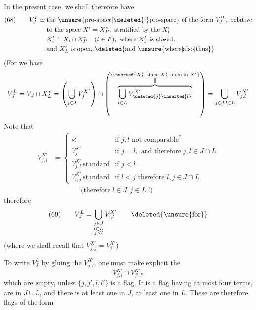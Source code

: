 
In the present case, we shall therefore have
\[
\begin{aligned}
(68)\qquad V_J^L\simeq{}&\text{the \unsure{pro-space|\deleted{t}pro-space} of the form }V_J^{\prime L},\text{ relative}\\
&\text{to the space }X'=X_{I'}^*,\text{ stratified by the }X_i'\\
&X_i'\doteq X_i\cap X_{I'}^*\quad(i\in I'),\text{ where }X_J'\text{ is closed,}\\
&\text{and }X_L'\text{ is open, }\deleted{\text{and }\unsure{\text{where}|\text{also}|\text{thus}}}
\end{aligned}
\]
(For we have
\[
V_J^L=V_J\cap X_L^*
=\left(\bigcup_{j\in J}V_j^{X'}\right)\cap
\left(\overbrace{\bigcup_{l\in L}V_{\deleted{j}\inserted{l}}^{X'}}^{\substack{\inserted{X_L^*\ \text{since }X_L^*\text{ open in }X'}\\\Vert}}\right)
=\bigcup_{j\in J,l\in L}V_{j,l}^{X'}
\]
Note that
\[
\begin{aligned}
V_{j,l}^{X'}&=
\begin{cases}
\varnothing&\text{if }j,l\text{ not comparable}^*\\
V_j^{X'}&\text{if }j=l,\text{ and therefore }j,l\in J\cap L\\
V_{j,l}^{X'}\ \text{standard}&\text{if }j<l\\
V_{l,j}^{X'}\ \text{standard}&\text{if }l<j\text{ therefore }l,j\in J\cap L
\end{cases}\\
&\qquad\qquad\text{(therefore }l\in J,j\in L\text{ !)}
\end{aligned}
\]
therefore
\[
(69)\qquad V_J^L=\bigcup_{\substack{j\in J\\l\in L\\j\leq l}}V_{j,l}^{X'}\qquad\deleted{\text{\unsure{for}}}
\]
(where we shall recall that $V_{j,j}^{X'}=V_j^{X'}$)


To write $V_J^L$ by \uline{gluing} the $V_{j,l}^{X'}$, one must make explicit the
\[
V_{j,l}^{X'}\cap V_{j',l'}^{X'}
\]
which are empty, unless $\{j,j',l,l'\}$ is a flag. It is a flag  having at most four  terms,   are in $J\cup L$, and there is at  least one in $J$, at least one in $L$. These are therefore flags of the form
